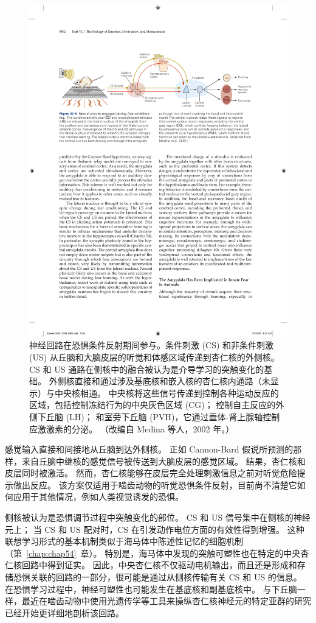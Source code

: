 \begin{figure}[htbp]
	\centering
	\includegraphics[width=0.95\linewidth]{chap42/fig_42_5}
	\caption{神经回路在恐惧条件反射期间参与。条件刺激 (CS) 和非条件刺激 (US) 从丘脑和大脑皮层的听觉和体感区域传递到杏仁核的外侧核。 CS 和 US 通路在侧核中的融合被认为是介导学习的突触变化的基础。 外侧核直接和通过涉及基底核和嵌入核的杏仁核内通路（未显示）与中央核相通。 中央核将这些信号传递到控制各种运动反应的区域，包括控制冻结行为的中央灰色区域 (CG)； 控制自主反应的外侧下丘脑 (LH)； 和室旁下丘脑 (PVH)，它通过垂体-肾上腺轴控制应激激素的分泌。 （改编自 Medina 等人，2002 年。）}
	\label{fig:42_5}
\end{figure}


感觉输入直接和间接地从丘脑到达外侧核。
正如 Cannon-Bard 假说所预测的那样，来自丘脑中继核的感觉信号被传送到大脑皮层的感觉区域。
结果，杏仁核和皮层同时被激活。
然而，杏仁核能够在皮层完全处理刺激信息之前对听觉危险提示做出反应。
该方案仅适用于啮齿动物的听觉恐惧条件反射，目前尚不清楚它如何应用于其他情况，例如人类视觉诱发的恐惧。


侧核被认为是恐惧调节过程中突触变化的部位。
CS 和 US 信号集中在侧核的神经元上；
当 CS 和 US 配对时，CS 在引发动作电位方面的有效性得到增强。
这种联想学习形式的基本机制类似于海马体中陈述性记忆的细胞机制（第~\ref{chap:chap54}~章）。
特别是，海马体中发现的突触可塑性也在特定的中央杏仁核回路中得到证实。
因此，中央杏仁核不仅驱动电机输出，而且还是形成和存储恐惧关联的回路的一部分，很可能是通过从侧核传输有关 CS 和 US 的信息。
在恐惧学习过程中，神经可塑性也可能发生在基底核和副基底核中。
与下丘脑一样，最近在啮齿动物中使用光遗传学等工具来操纵杏仁核神经元的特定亚群的研究已经开始更详细地剖析该回路。


